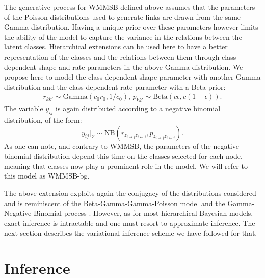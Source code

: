 The generative process for WMMSB defined above assumes that the parameters of the Poisson distributions used to generate links are drawn from the same Gamma distribution. Having a unique prior over these parameters however limits the ability of the model to capture the variance in the relations between the latent classes. Hierarchical extensions can be used here to have a better representation of the classes and the relations between them through class-dependent shape and rate parameters in the above Gamma distribution. We propose here to model the class-dependent shape parameter with another Gamma distribution and the class-dependent rate parameter with a Beta prior:
%
\begin{gather*}
r_{kk'} \sim \textrm{Gamma}(c_0r_0, 1/c_0), \, p_{kk'} \sim \textrm{Beta}(c\epsilon, c(1-\epsilon)).
\end{gather*}
%
The variable $y_{ij}$ is again distributed according to a negative binomial distribution, of the form:
%
\begin{equation}\label{eq:yNB}
y_{ij}|_{Z} \sim \textrm{NB}(r_{z_{i \rightarrow j} z_{i \leftarrow j}},p_{z_{i \rightarrow j} z_{i \leftarrow j}}).
\end{equation}
%
As one can note, and contrary to WMMSB, the parameters of the negative binomial distribution depend this time on the classes selected for each node, meaning that classes now play a prominent role in the model. We will refer to this model as WMMSB-bg.

The above extension exploits again the conjugacy of the distributions considered and is reminiscent of the Beta-Gamma-Gamma-Poisson model \cite{zhou2012beta} and the Gamma-Negative Binomial process \cite{zhou2015negative}. However, as for most hierarchical Bayesian models, exact inference is intractable and one must resort to approximate inference. The next section describes the variational inference scheme we have followed for that.

\section{Inference}
\label{sec:inference}

